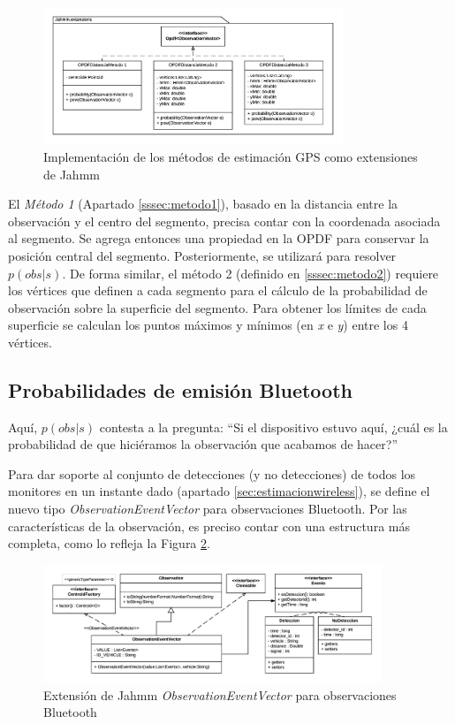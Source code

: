 \begin{figure}[!htp]
	\centering
	\includegraphics[width=0.8\textwidth]{images/jahmm-gps.png}
	\caption{Implementación de los métodos de estimación GPS como extensiones de Jahmm}
    \label{fig:jahmm-gps}
\end{figure}

El \textit{Método 1} (Apartado \ref{sssec:metodo1}), basado en la distancia entre la observación y el centro del segmento, precisa contar con la coordenada asociada al segmento. Se agrega entonces una propiedad en la OPDF para conservar la posición central del segmento. Posteriormente, se utilizará para resolver $p(obs|s)$. De forma similar, el método 2 (definido en \ref{sssec:metodo2}) requiere los vértices que definen a cada segmento para el cálculo de la probabilidad de observación sobre la superficie del segmento. Para obtener los límites de cada superficie se calculan los puntos máximos y mínimos (en \textit{x} e \textit{y}) entre los 4 vértices.

\subsection{Probabilidades de emisión Bluetooth}

Aquí, $p(obs|s)$ contesta a la pregunta: ``Si el dispositivo estuvo aquí, ¿cuál es la probabilidad de que hiciéramos la observación que acabamos de hacer?''

Para dar soporte al conjunto de detecciones (y no detecciones) de todos los monitores en un instante dado  (apartado \ref{sec:estimacionwireless}), se define el nuevo tipo \textit{ObservationEventVector} para observaciones Bluetooth. Por las características de la observación, es preciso contar con una estructura más completa, como lo refleja la Figura \ref{fig:jahmm-eventvector}.

\begin{figure}[!htp]
	\centering
	\includegraphics[width=0.9\textwidth]{images/jahmm-eventvector.png}
	\captionsetup{width=0.8\textwidth}
	\caption{Extensión de Jahmm \textit{ObservationEventVector} para observaciones Bluetooth}
    \label{fig:jahmm-eventvector}
\end{figure}

